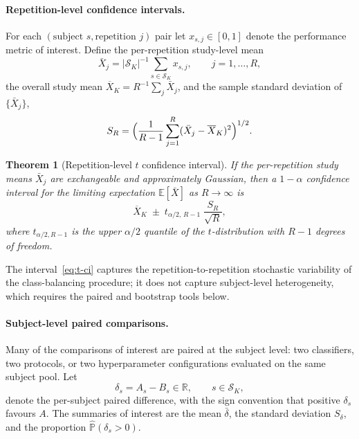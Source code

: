 \documentclass[onluarkali,ingilizce,yukseklisans,karton,LisansustuEgitim]{itutez}
\newtheorem{theorem}{Theorem}[chapter]
\providecommand{\R}{\mathbb{R}}
\providecommand{\E}{\mathbb{E}}
\providecommand{\Prob}{\mathbb{P}}
\providecommand{\1}{\mathbf{1}}
\providecommand{\Sset}{\mathcal{S}}
\begin{document}
\paragraph{Repetition-level confidence intervals.}
For each $(\text{subject } s,\text{repetition } j)$ pair let $x_{s,j}\in[0,1]$ denote the performance metric of interest. Define the per-repetition study-level mean
\[
  \bar X_j=|\Sset_K|^{-1}\sum_{s\in\Sset_K}x_{s,j},
  \qquad j=1,\ldots,R,
\]
the overall study mean $\overline{X}_K=R^{-1}\sum_j\bar X_j$, and the sample standard deviation of $\{\bar X_j\}$,
\[
  S_R=\Bigl(\frac{1}{R-1}\sum_{j=1}^R(\bar X_j-\overline{X}_K)^2\Bigr)^{1/2}.
\]

\begin{theorem}[Repetition-level $t$ confidence interval]
\label{thm:t-ci}
If the per-repetition study means $\bar X_j$ are exchangeable and approximately Gaussian, then a $1-\alpha$ confidence interval for the limiting expectation $\E[\bar X]$ as $R\to\infty$ is
\begin{equation}
  \overline{X}_K\;\pm\;t_{\alpha/2,\,R-1}\;\frac{S_R}{\sqrt R},
  \label{eq:t-ci}
\end{equation}
where $t_{\alpha/2,R-1}$ is the upper $\alpha/2$ quantile of the $t$-distribution with $R-1$ degrees of freedom.
\end{theorem}

The interval~\eqref{eq:t-ci} captures the repetition-to-repetition stochastic variability of the class-balancing procedure; it does not capture subject-level heterogeneity, which requires the paired and bootstrap tools below.

\paragraph{Subject-level paired comparisons.}
Many of the comparisons of interest are paired at the subject level: two classifiers, two protocols, or two hyperparameter configurations evaluated on the same subject pool. Let
\[
  \delta_s=A_s-B_s\in\R,\qquad s\in\Sset_K,
\]
denote the per-subject paired difference, with the sign convention that positive $\delta_s$ favours $A$. The summaries of interest are the mean $\bar\delta$, the standard deviation $S_\delta$, and the proportion $\widehat{\Prob}(\delta_s>0)$.
\end{document}
